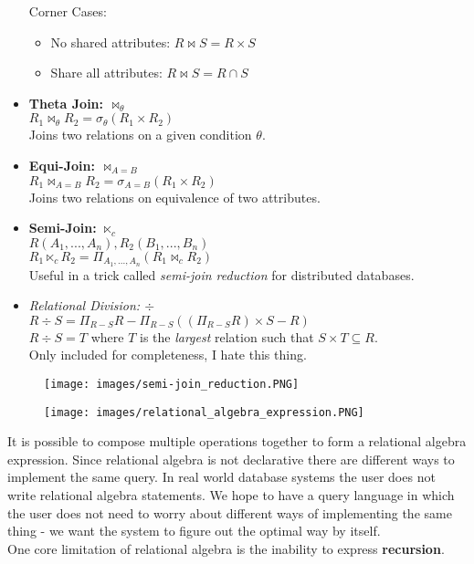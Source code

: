 \begin{itemize}
Corner Cases: \begin{itemize}
\item No shared attributes: $R \Join S = R \times S$
\item Share all attributes: $R \Join S = R \cap S$
\end{itemize}
\item \textbf{Theta Join: $\Join_\theta$}\\
$R_1 \Join_\theta R_2 = \sigma_\theta(R_1 \times R_2)$\\
Joins two relations on a given condition $\theta$.
\item \textbf{Equi-Join: $\Join_{A=B}$}\\
$R_1 \Join_{A=B} R_2 = \sigma_{A=B}(R_1 \times R_2)$\\
Joins two relations on equivalence of two attributes.
\item \textbf{Semi-Join: $\ltimes_c$}\\
$R(A_1, ..., A_n), R_2(B_1, ..., B_n)$\\
$R_1 \ltimes_c R_2 = \Pi_{A_1, ..., A_n}(R_1 \Join_c R_2)$\\
Useful in a trick called \textit{semi-join reduction} for distributed databases.
\item \textit{Relational Division: $\div$}\\
$R \div S = \Pi_{R-S}R - \Pi_{R-S}((\Pi_{R-S}R) \times S - R)$\\
$R \div S = T$ where $T$ is the \textit{largest} relation such that $S \times T \subseteq R$.\\
Only included for completeness, I hate this thing.
\end{itemize}
\begin{figure}[H]
\begin{minipage}[t]{.5\textwidth}
\centering
\texttt{[image: images/semi-join\_reduction.PNG]}
\label{semi_join_reduction}
\end{minipage}
\begin{minipage}[t]{.5\textwidth}
\centering
\texttt{[image: images/relational\_algebra\_expression.PNG]}
\label{relational_algebra_expression}
\end{minipage}
\end{figure}

It is possible to compose multiple operations together to form a relational algebra expression.
Since relational algebra is not declarative there are different ways to implement the same query. In real world database systems the user does not write relational algebra statements. We hope to have a query language in which the user does not need to worry about different ways of implementing the same thing - we want the system to figure out the optimal way by itself.\vspace{.2cm}\\
One core limitation of relational algebra is the inability to express \textbf{recursion}.

